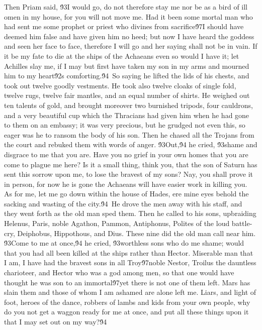 {Then Priam said, \'93I would go, do not therefore stay me nor be as a bird of ill omen in my house, for you will not move me. Had it been some mortal man who had sent me some prophet or priest who divines from sacrifice\'97I should have deemed him false and have given him no heed; but now I have heard the goddess and seen her face to face, therefore I will go and her saying shall not be in vain. If it be my fate to die at the ships of the Achaeans even so would I have it; let Achilles slay me, if I may but first have taken my son in my arms and mourned him to my heart\'92s comforting.\'94\
So saying he lifted the lids of his chests, and took out twelve goodly vestments. He took also twelve cloaks of single fold, twelve rugs, twelve fair mantles, and an equal number of shirts. He weighed out ten talents of gold, and brought moreover two burnished tripods, four cauldrons, and a very beautiful cup which the Thracians had given him when he had gone to them on an embassy; it was very precious, but he grudged not even this, so eager was he to ransom the body of his son. Then he chased all the Trojans from the court and rebuked them with words of anger. \'93Out,\'94 he cried, \'93shame and disgrace to me that you are. Have you no grief in your own homes that you are come to plague me here? Is it a small thing, think you, that the son of Saturn has sent this sorrow upon me, to lose the bravest of my sons? Nay, you shall prove it in person, for now he is gone the Achaeans will have easier work in killing you. As for me, let me go down within the house of Hades, ere mine eyes behold the sacking and wasting of the city.\'94\
He drove the men away with his staff, and they went forth as the old man sped them. Then he called to his sons, upbraiding Helenus, Paris, noble Agathon, Pammon, Antiphonus, Polites of the loud battle-cry, Deiphobus, Hippothous, and Dius. These nine did the old man call near him. \'93Come to me at once,\'94 he cried, \'93worthless sons who do me shame; would that you had all been killed at the ships rather than Hector. Miserable man that I am, I have had the bravest sons in all Troy\'97noble Nestor, Troilus the dauntless charioteer, and Hector who was a god among men, so that one would have thought he was son to an immortal\'97yet there is not one of them left. Mars has slain them and those of whom I am ashamed are alone left me. Liars, and light of foot, heroes of the dance, robbers of lambs and kids from your own people, why do you not get a waggon ready for me at once, and put all these things upon it that I may set out on my way?\'94\
}

